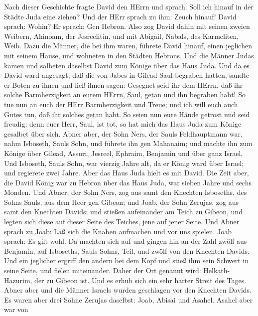  Nach dieser Geschichte fragte David den HErrn und sprach:
Soll ich hinauf in der Städte Juda eine ziehen? Und der HErr sprach zu
ihm: Zeuch hinauf! David sprach: Wohin? Er sprach: Gen Hebron.
 Also zog David dahin mit seinen zweien Weibern, Ahinoam,
der Jesreelitin, und mit Abigail, Nabals, des Karmeliten, Weib.
 Dazu die Männer, die bei ihm waren, führete David hinauf,
einen jeglichen mit seinem Hause, und wohneten in den Städten Hebrons.
 Und die Männer Judas kamen und salbeten daselbst David zum
Könige über das Haus Juda. Und da es David ward angesagt, daß die von
Jabes in Gilead Saul begraben hatten,  sandte er Boten zu
ihnen und ließ ihnen sagen: Gesegnet seid ihr dem HErrn, daß ihr solche
Barmherzigkeit an eurem HErrn, Saul, getan und ihn begraben habt!
 So tue nun an euch der HErr Barmherzigkeit und Treue; und
ich will euch auch Gutes tun, daß ihr solches getan habt. 
So seien nun eure Hände getrost und seid freudig; denn euer Herr, Saul,
ist tot, so hat mich das Haus Juda zum Könige gesalbet über sich.
 Abner aber, der Sohn Ners, der Sauls Feldhauptmann war,
nahm Isboseth, Sauls Sohn, und führete ihn gen Mahanaim; 
und machte ihn zum Könige über Gilead, Assuri, Jesreel, Ephraim,
Benjamin und über ganz Israel.  Und Isboseth, Sauls Sohn,
war vierzig Jahre alt, da er König ward über Israel; und regierete zwei
Jahre. Aber das Haus Juda hielt es mit David.  Die Zeit
aber, die David König war zu Hebron über das Haus Juda, war sieben Jahre
und sechs Monden.  Und Abner, der Sohn Ners, zog aus samt
den Knechten Isboseths, des Sohns Sauls, aus dem Heer gen Gibeon;
 und Joab, der Sohn Zerujas, zog aus samt den Knechten
Davids; und stießen aufeinander am Teich zu Gibeon, und legten sich
diese auf dieser Seite des Teiches, jene auf jener Seite. 
Und Abner sprach zu Joab: Laß sich die Knaben aufmachen und vor uns
spielen. Joab sprach: Es gilt wohl.  Da machten sich auf
und gingen hin an der Zahl zwölf aus Benjamin, auf Isboseths, Sauls
Sohns, Teil, und zwölf von den Knechten Davids.  Und ein
jeglicher ergriff den andern bei dem Kopf und stieß ihm sein Schwert in
seine Seite, und fielen miteinander. Daher der Ort genannt wird:
Helkath- Hazurim, der zu Gibeon ist.  Und es erhub sich ein
sehr harter Streit des Tages. Abner aber und die Männer Israels wurden
geschlagen vor den Knechten Davids.  Es waren aber drei
Söhne Zerujas daselbst: Joab, Abisai und Asahel. Asahel aber war von
